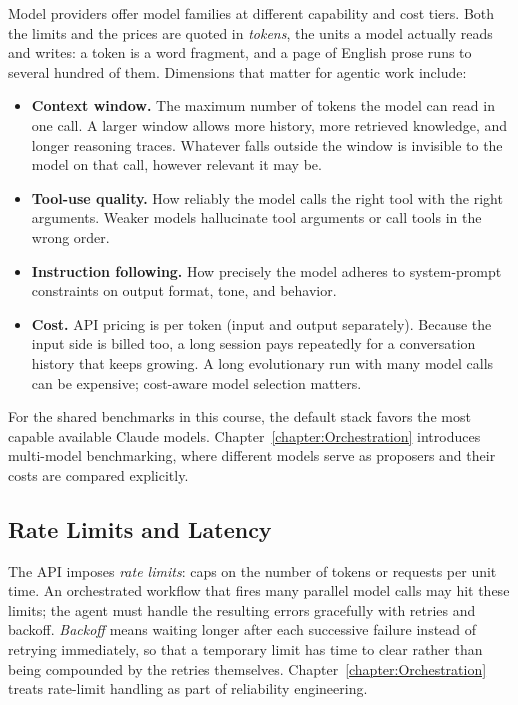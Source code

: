 Model providers offer model families at different capability and cost tiers.
Both the limits and the prices are quoted in \emph{tokens}, the units a model actually reads and writes: a token is a word fragment, and a page of English prose runs to several hundred of them.
Dimensions that matter for agentic work include:
\begin{itemize}
\item \textbf{Context window.} The maximum number of tokens the model can read in one call.
A larger window allows more history, more retrieved knowledge, and longer reasoning traces.
Whatever falls outside the window is invisible to the model on that call, however relevant it may be.
\item \textbf{Tool-use quality.} How reliably the model calls the right tool with the right arguments.
Weaker models hallucinate tool arguments or call tools in the wrong order.
\item \textbf{Instruction following.} How precisely the model adheres to system-prompt constraints on output format, tone, and behavior.
\item \textbf{Cost.} API pricing is per token (input and output separately).
Because the input side is billed too, a long session pays repeatedly for a conversation history that keeps growing.
A long evolutionary run with many model calls can be expensive; cost-aware model selection matters.
\end{itemize}

For the shared benchmarks in this course, the default stack favors the most capable available Claude models.
Chapter~\ref{chapter:Orchestration} introduces multi-model benchmarking, where different models serve as proposers and their costs are compared explicitly.

\subsection{Rate Limits and Latency}

The API imposes \emph{rate limits}: caps on the number of tokens or requests per unit time.
An orchestrated workflow that fires many parallel model calls may hit these limits; the agent must handle the resulting errors gracefully with retries and backoff.
\emph{Backoff} means waiting longer after each successive failure instead of retrying immediately, so that a temporary limit has time to clear rather than being compounded by the retries themselves.
Chapter~\ref{chapter:Orchestration} treats rate-limit handling as part of reliability engineering.

